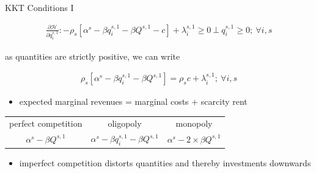 \begin{frame}{KKT Conditions I}


\begin{gather}
\frac{\partial \mathcal{H}}{ \partial q_{i}^{s,1}}: - \rho_s \left[ \alpha^s - \beta q_{i}^{s,1} - \beta Q^{s,1} - c \right] + \lambda_{i}^{s,1} \geq 0 \ \bot \ q_{i}^{s,1} \geq 0;\ \forall i,s \label{eq:foc1a}
\end{gather}

as quantities are strictly positive, we can write

\begin{gather}
 \rho_s \left[ \alpha^s - \beta q_{i}^{s,1} - \beta Q^{s,1}\right]=  \rho_s c  + \lambda_{i}^{s,1} ;\ \forall i,s    \label{eq:foc1b}
\end{gather}

\begin{itemize}
	\item expected marginal revenues = marginal costs + scarcity rent
\end{itemize}

\begin{tabular}{ccc}
 \hline
perfect competition & oligopoly &  monopoly \\
$\alpha^s - \beta Q^{s,1}$ &  $\alpha^s - \beta q_{i}^{s,1} - \beta Q^{s,1}$    & $\alpha^s - 2\times \beta Q^{s,1}$  \\
 \hline
\end{tabular}

\begin{itemize}
	\item imperfect competition distorts quantities and thereby investments downwards
\end{itemize}

\end{frame}

